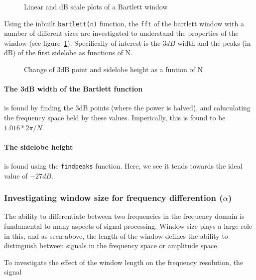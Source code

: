 \documentclass[main.tex]{subfiles}
\begin{document}
\begin{figure}[H]
	\centering 
	\resizebox{\textwidth}{!}{}
	\caption{Linear and dB scale plots of a Bartlett window}
	\label{fig:q1_3_a}
\end{figure}

Using the inbuilt {\tt bartlett(n)} function, the {\tt fft} of the bartlett window with a number of different sizes are investigated to understand the properties of the window (see figure~\ref{fig:q1_3_a}). Specifically of interest is the $3dB$ width and the peaks (in dB) of the first sidelobe as functions of N.  

\begin{figure}[H]
	\centering 
	\resizebox{\textwidth}{!}{}
	\caption{Change of 3dB point and sidelobe height as a funtion of N}
	\label{fig:q1_3_1}
\end{figure}

\paragraph{The 3dB width of the Bartlett function} is found by finding the 3dB points (where the power is halved), and caluculating the frequency space held by these values. Imperically, this is found to be $1.016 * 2\pi/N$.

\paragraph{The sidelobe height} is found using the {\tt findpeaks} function. Here, we see it tends towards the ideal value of $-27dB$.








\subsubsection{Investigating window size for frequency differention ($\alpha$)}

The ability to differentiate between two frequencies in the frequency domain is fundamental to many aspects of signal processing. Window size plays a large role in this, and as seen above, the length of the window defines the ability to distinguish between signals in the frequency space or amplitude space.

To investigate the effect of the window length on the frequency resolution, the signal 
\end{document}
